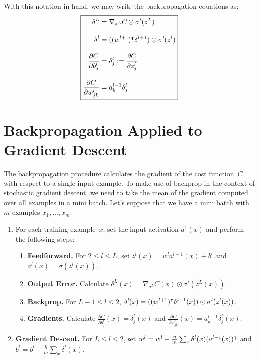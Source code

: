 With this notation in hand, we may write the backpropagation equations
as:
\begin{equation}
\boxed{
\setlength{\jot}{12pt}
\begin{aligned}
    \delta^{L} & = \nabla_{a^L} C \odot \sigma'(z^L) \\
    \delta^{l} & = ( \trans{(w^{l + 1})} \delta^{l + 1} ) \odot \sigma'(z^l) \\
    \frac{\partial C}{\partial b_j^{l}} & = \delta_{j}^l := \frac{\partial C}{\partial z_j^l}\\
    \frac{\partial C}{\partial w_{j k}^l} & = a_{k}^{l - 1} \delta_{j}^l
\end{aligned}
}
\end{equation}

\section{Backpropagation Applied to Gradient Descent}

The backpropagation procedure calculates the gradient of the cost
function~$C$ with respect to a single input example. To make use of
backprop in the context of stochastic gradient descent, we need to take
the mean of the gradient computed over all examples in a mini batch.
Let's suppose that we have a mini batch with $m$ examples
$x_1, \ldots, x_m$.
\begin{enumerate}
    \item For each training example~$x$, set the input activation
        $a^1 (x)$ and perform the following steps:
        \begin{enumerate}
            \item \textbf{Feedforward.} For $2 \leq l \leq L$, set
                $z^l (x) = w^l a^{l - 1} (x) + b^l$ and
                $a^l (x) = \sigma (z^l (x))$.
            \item \textbf{Output Error.} Calculate
                $\delta^L (x) = \nabla_{a^L} C(x) \odot \sigma' (z^L (x) )$.
            \item \textbf{Backprop.} For $L - 1 \leq l \leq 2$,
                $\delta^l (x) = ( (w^{l + 1})^{\intercal} \delta^{l + 1} (x) )
                                    \odot \sigma' (z^l (x))$.
            \item \textbf{Gradients.} Calculate
            $ \frac{\partial C}{\partial b_j^{l}} (x) = \delta_{j}^l (x)$
            and $\frac{\partial C}{\partial w_{j k}^l} (x)
                    = a_{k}^{l - 1} \delta_{j}^l (x)$.
        \end{enumerate}
    \item \textbf{Gradient Descent.} For $L \leq l \leq 2$, set
        $w^l = w^l - \frac{\eta}{m} \sum_{x} \delta^{l} (x) (a^{l - 1} (x))^{\intercal}$
        and
        $b^l = b^l - \frac{\eta}{m} \sum_{x} \delta^l (x)$.
\end{enumerate}
